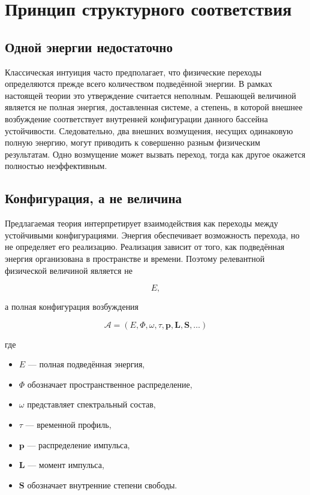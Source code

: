 \chapter{Принцип структурного соответствия}

\section{Одной энергии недостаточно}

Классическая интуиция часто предполагает, что физические переходы определяются прежде всего количеством подведённой энергии. В рамках настоящей теории это утверждение считается неполным. Решающей величиной является не полная энергия, доставленная системе, а степень, в которой внешнее возбуждение соответствует внутренней конфигурации данного бассейна устойчивости. Следовательно, два внешних возмущения, несущих одинаковую полную энергию, могут приводить к совершенно разным физическим результатам. Одно возмущение может вызвать переход, тогда как другое окажется полностью неэффективным.

\section{Конфигурация, а не величина}

Предлагаемая теория интерпретирует взаимодействия как переходы между устойчивыми конфигурациями. Энергия обеспечивает возможность перехода, но не определяет его реализацию. Реализация зависит от того, как подведённая энергия организована в пространстве и времени. Поэтому релевантной физической величиной является не

\[ E, \]

а полная конфигурация возбуждения

\[ \boxed{ \mathcal A = (E, \Phi, \omega, \tau, \mathbf p, \mathbf L, \mathbf S, \dots) } \]

где

\begin{itemize}

\item $E$ — полная подведённая энергия,

\item $\Phi$ обозначает пространственное распределение,

\item $\omega$ представляет спектральный состав,

\item $\tau$ — временной профиль,

\item $\mathbf p$ — распределение импульса,

\item $\mathbf L$ — момент импульса,

\item $\mathbf S$ обозначает внутренние степени свободы.

\end{itemize}


